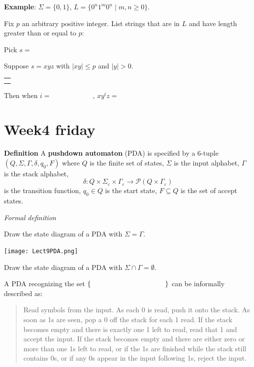 \documentclass[12pt, oneside]{article}
\begin{document}
\vspace{30pt} 

{\bf Example}: $\Sigma  =  \{0,1\}$, $L = \{0^n1^m0^n  \mid m,n  \geq 0\}$.

Fix $p$ an arbitrary positive integer. List strings that are in $L$ and have length  greater than or equal  to $p$:

\vspace{10pt}

Pick $s = $


Suppose $s = xyz$ with  $|xy|  \leq  p$ and $|y| > 0$.
\begin{center}
\begin{tabular}{|c|}
\hline
 \\
\hspace{4in} \\
\hline
\end{tabular}
\end{center}
Then when $i = \hspace{1in}$, $xy^i z  = \hspace{1in}$
 \vfill
\section*{Week4 friday}


{\bf Definition} A {\bf pushdown automaton} (PDA) is  specified by a  $6$-tuple $(Q, \Sigma, \Gamma, \delta, q_0, F)$
where $Q$ is the finite set of states, $\Sigma$ is the input alphabet,  $\Gamma$ is the stack alphabet,
\[
    \delta: Q \times \Sigma_\varepsilon  \times  \Gamma_\varepsilon \to \mathcal{P}( Q \times \Gamma_\varepsilon)
\]
is the transition function,  $q_0 \in Q$ is the start state, $F \subseteq  Q$ is the set of accept states.
    
\begin{multicols}{2}
    {\it Formal definition}
    
    \vspace{90pt}
    Draw the state diagram of a PDA with $\Sigma = \Gamma$.
    
    \columnbreak 
    \texttt{[image: Lect9PDA.png]}
    
    
    Draw the state diagram of a PDA with $\Sigma \cap \Gamma = \emptyset$.
    
\end{multicols}
    
\vspace{60pt}
    
A PDA recognizing the set $\{ \hspace{1.5 in} \}$ can be informally described as:
\begin{quote}
    Read symbols from the input. As each 0 is read, push it onto the stack. As soon as 1s are seen, pop a 0 off the stack for each 1 read. If the stack becomes empty and there is exactly one 1 left to read, read that 1 and accept the input. If the stack becomes empty and there are either zero or more than one 1s left to read, or if the 1s are finished while the stack still contains 0s, or if any 0s appear in the input following 1s, reject the input.
\end{quote}
    
\end{document}
